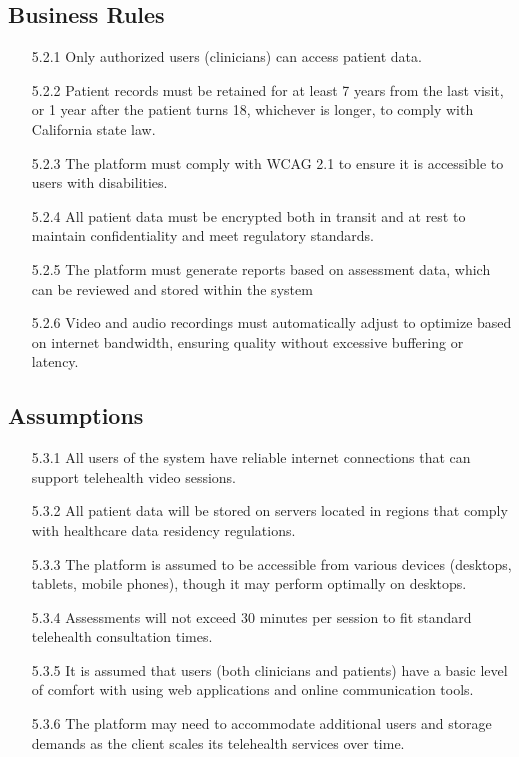 \documentclass[12pt]{article}
\begin{document}
\subsection{Business Rules}
\begin{itemize}
  \item[5.2.1] Only authorized users (clinicians) can access patient data.
  \item[5.2.2] Patient records must be retained for at least 7 years from the last visit, or 1 year after the patient turns 18, whichever is longer, 
  to comply with California state law.
  \item[5.2.3] The platform must comply with WCAG 2.1 to ensure it is accessible to users with disabilities.
  \item[5.2.4] All patient data must be encrypted both in transit and at rest to maintain confidentiality and meet regulatory standards.
  \item[5.2.5] The platform must generate reports based on assessment data, which can be reviewed and stored within the system 
  \item[5.2.6] Video and audio recordings must automatically adjust to optimize based on internet bandwidth, ensuring quality without excessive 
  buffering or latency.
\end{itemize}
\subsection{Assumptions}
\begin{itemize}
  \item[5.3.1] All users of the system have reliable internet connections that can support telehealth video sessions.
  \item[5.3.2] All patient data will be stored on servers located in regions that comply with healthcare data residency regulations.
  \item[5.3.3] The platform is assumed to be accessible from various devices (desktops, tablets, mobile phones), though it may perform optimally on 
  desktops.
  \item[5.3.4] Assessments will not exceed 30 minutes per session to fit standard telehealth consultation times.
  \item[5.3.5] It is assumed that users (both clinicians and patients) have a basic level of comfort with using web applications and online 
  communication tools.
  \item[5.3.6] The platform may need to accommodate additional users and storage demands as the client scales its telehealth services over time.
\end{itemize}
\end{document}
